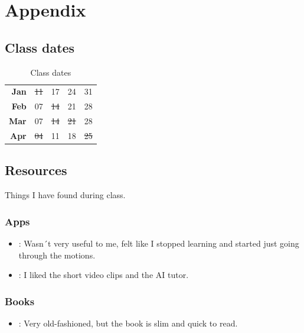 \chapter{Appendix}

\section*{Class dates}
\begin{table}[ht]
	\centering
	\begin{tabular}{r c c c c }
		\textbf{Jan} & \sout{11} & 17        & 24        & 31  \\
		\textbf{Feb} & 07        & \sout{14} & 21        & 28  \\
		\textbf{Mar} & 07        & \sout{14} & \sout{21} & 28  \\
		\textbf{Apr} & \sout{04} & 11        & 18        & \sout{25}             
	\end{tabular}
	\caption{Class dates}
	\label{tab:tClassDates}
\end{table}

\section*{Resources}
Things I have found during class.

\subsection*{Apps}
    \begin{itemize}
        \item \cite{Duolingo}: Wasn´t very useful to me, felt like I stopped learning and started just going through the motions.
        \item \cite{Memrise}: I liked the short video clips and the AI tutor.        
    \end{itemize}  

\subsection*{Books}
    \begin{itemize}
        \item \cite{Ragusa}: Very old-fashioned, but the book is slim and quick to read.
    \end{itemize}  

